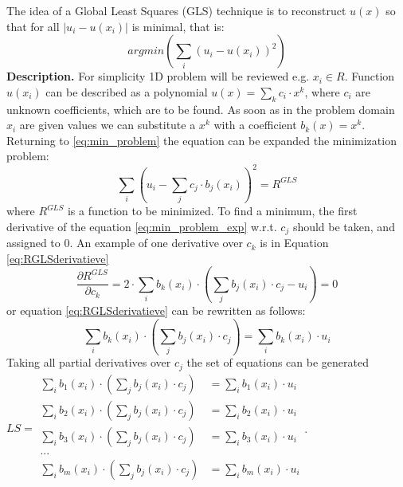 The idea of a Global Least Squares (GLS) technique is to reconstruct $u(x)$ so that for all $|u_i - u(x_i)|$ is minimal, that is:
\begin{equation}
	argmin(\sum_i (u_i - u(x_i))^2)
	\label{eq:min_problem}
\end{equation}
\textbf{Description.} For simplicity 1D problem will be reviewed e.g. $x_i \in R$. Function $u(x_i)$ can be described as a polynomial $u(x)=\sum_k{c_i \cdot x^k}$, where $c_i$ are unknown coefficients, which are to be found.
As soon as in the problem domain $x_i$ are given values we can substitute a $x^k$ with a coefficient $b_k(x) = x^k$. Returning to \ref{eq:min_problem} the equation can be expanded the minimization problem:
\begin{equation}
	\sum_i (u_i - \sum_j{c_j \cdot b_j(x_i)})^2 = R^{GLS}
	\label{eq:min_problem_exp}
\end{equation}
where $R^{GLS}$ is a function to be minimized. To find a minimum, the first derivative of the equation \ref{eq:min_problem_exp} w.r.t. $c_j$ should be taken, and assigned to 0. An example of one derivative over $c_k$ is in Equation \ref{eq:RGLSderivatieve}
\begin{equation}
	\dfrac{\partial R^{GLS}}{\partial c_k} = 2\cdot \sum_i{b_k(x_i) \cdot (\sum_j{b_j(x_i)\cdot c_j} - u_i)} = 0
	\label{eq:RGLSderivatieve}
\end{equation}
or equation \ref{eq:RGLSderivatieve}  can be rewritten as follows:
\begin{equation}
	\sum_i{b_k(x_i) \cdot (\sum_j{b_j(x_i)\cdot c_j})}  = \sum_i {b_k(x_i) \cdot u_i}
	\label{eq:RGLSderFinal}
\end{equation}
Taking all partial derivatives over $c_j$ the set of equations can be generated $LS = 
\begin{matrix}
	\sum_i{b_1(x_i) \cdot (\sum_j{b_j(x_i)\cdot c_j})}  &= \sum_i {b_1(x_i) \cdot u_i}\\
	\sum_i{b_2(x_i) \cdot (\sum_j{b_j(x_i)\cdot c_j})}  &= \sum_i {b_2(x_i) \cdot u_i}\\
	\sum_i{b_3(x_i) \cdot (\sum_j{b_j(x_i)\cdot c_j})}  &= \sum_i {b_3(x_i) \cdot u_i}\\
	...\\
	\sum_i{b_m(x_i) \cdot (\sum_j{b_j(x_i)\cdot c_j})}  &= \sum_i {b_m(x_i) \cdot u_i}\\
\end{matrix}$.

